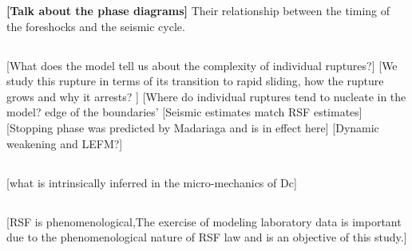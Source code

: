 \documentclass[preprint,1p, 10pt,authoryear]{elsarticle}
\begin{document}
\textbf{[Talk about the phase diagrams]} 
Their relationship between the timing of the foreshocks and the seismic cycle. 


\subsection{}
[What does the model tell us about the complexity of individual ruptures?]
[We study this rupture in terms of its transition to rapid sliding, how the rupture grows and why it arrests?  ]
[Where do individual ruptures tend to nucleate in the model? edge of the boundaries'
[Seismic estimates match RSF estimates]
[Stopping phase was predicted by Madariaga and is in effect here]
[Dynamic weakening and LEFM?]

\subsection{}
[what is intrinsically inferred in the micro-mechanics of Dc]

\subsection{}
[RSF is phenomenological,The exercise of modeling laboratory data is important due to the phenomenological nature of RSF law and is an objective of this study.]
\end{document}
